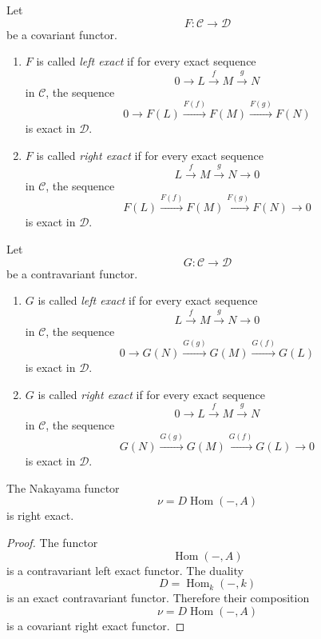 \documentclass[11pt, a4paper]{report}
\begin{document}
\begin{definition}
Let
\[
F:\mathcal C\longrightarrow \mathcal D
\]
be a covariant functor.

\begin{enumerate}
    \item \(F\) is called \emph{left exact} if for every exact sequence
    \[
    0 \longrightarrow L \xrightarrow{f} M \xrightarrow{g} N
    \]
    in \(\mathcal C\), the sequence
    \[
    0 \longrightarrow F(L)
    \xrightarrow{F(f)}
    F(M)
    \xrightarrow{F(g)}
    F(N)
    \]
    is exact in \(\mathcal D\).

    \item \(F\) is called \emph{right exact} if for every exact sequence
    \[
    L \xrightarrow{f} M \xrightarrow{g} N \longrightarrow 0
    \]
    in \(\mathcal C\), the sequence
    \[
    F(L)
    \xrightarrow{F(f)}
    F(M)
    \xrightarrow{F(g)}
    F(N)
    \longrightarrow 0
    \]
    is exact in \(\mathcal D\).
\end{enumerate}
\end{definition}

\begin{definition}
Let
\[
G:\mathcal C\longrightarrow \mathcal D
\]
be a contravariant functor.

\begin{enumerate}
    \item \(G\) is called \emph{left exact} if for every exact sequence
    \[
    L \xrightarrow{f} M \xrightarrow{g} N \longrightarrow 0
    \]
    in \(\mathcal C\), the sequence
    \[
    0 \longrightarrow G(N)
    \xrightarrow{G(g)}
    G(M)
    \xrightarrow{G(f)}
    G(L)
    \]
    is exact in \(\mathcal D\).

    \item \(G\) is called \emph{right exact} if for every exact sequence
    \[
    0 \longrightarrow L \xrightarrow{f} M \xrightarrow{g} N
    \]
    in \(\mathcal C\), the sequence
    \[
    G(N)
    \xrightarrow{G(g)}
    G(M)
    \xrightarrow{G(f)}
    G(L)
    \longrightarrow 0
    \]
    is exact in \(\mathcal D\).
\end{enumerate}
\end{definition}

\begin{proposition}
The Nakayama functor
\[
\nu = D\operatorname{Hom}(-,A)
\]
is right exact.
\end{proposition}

\begin{proof}
The functor
\[
\operatorname{Hom}(-,A)
\]
is a contravariant left exact functor. The duality
\[
D=\operatorname{Hom}_k(-,k)
\]
is an exact contravariant functor. Therefore their composition
\[
\nu=D\operatorname{Hom}(-,A)
\]
is a covariant right exact functor.
\end{proof}
\end{document}
